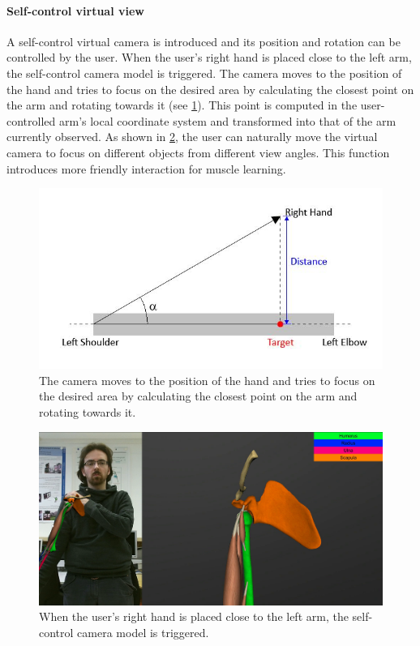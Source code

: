 \paragraph{Self-control virtual view}
A self-control virtual camera is introduced and its position and rotation can be controlled by the user. When the user's right hand is placed close to the left arm, the self-control camera model is triggered. The camera moves to the position of the hand and tries to focus on the desired area by calculating the closest point on the arm and rotating towards it (see \figurename{\ref{fig:3-IMR:selfControlCamera}}). This point is computed in the user-controlled arm's local coordinate system and transformed into that of the arm currently observed. As shown in \figurename{\ref{fig:3-IMR:MuscleLearningSelfControlCamera}}, the user can naturally move the virtual camera to focus on different objects from different view angles. This function introduces more friendly interaction for muscle learning.
\begin{figure}
\centering
\includegraphics[width=0.7\linewidth]{figures/3-IMR/selfControlCamera}
\caption{The camera moves to the position of the hand and tries to focus on the desired area by calculating the closest point on the arm and rotating towards it.}
\label{fig:3-IMR:selfControlCamera}
\end{figure}

\begin{figure}
	\centering
	\includegraphics[width=0.8\linewidth]{figures/3-IMR/MuscleLearningSelfControlCamera}
	\caption{When the user's right hand is placed close to the left arm, the self-control camera model is triggered.}
	\label{fig:3-IMR:MuscleLearningSelfControlCamera}
\end{figure}
